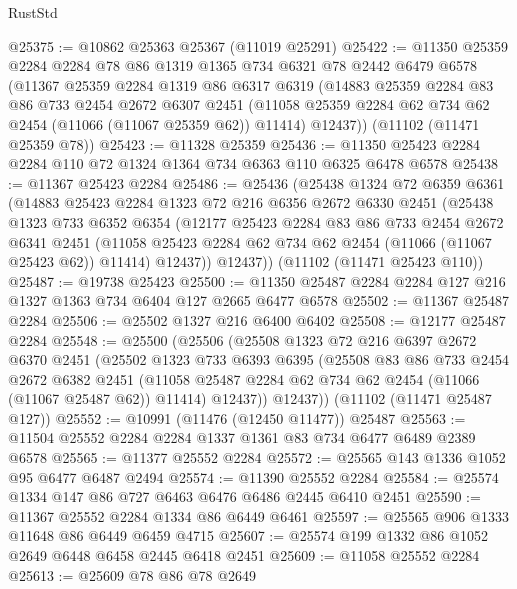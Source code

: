 \begin{lexlean}{RustStd}
\begin{coremodule}
@25375 := @10862 @25363 @25367 (@11019 @25291)
@25422 := @11350
    @25359
    @2284
    @2284
    @78
    @86
    @1319
    @1365
    @734
    @6321
    @78
    @2442
    @6479
    @6578
    (@11367
      @25359
      @2284
      @1319
      @86
      @6317
      @6319
      (@14883
        @25359
        @2284
        @83
        @86
        @733
        @2454
        @2672
        @6307
        @2451
        (@11058 @25359 @2284 @62 @734 @62 @2454 (@11066 (@11067 @25359 @62)) @11414)
        @12437))
    (@11102 (@11471 @25359 @78))
@25423 := @11328 @25359
@25436 := @11350 @25423 @2284 @2284 @110 @72 @1324 @1364 @734 @6363 @110 @6325 @6478 @6578
@25438 := @11367 @25423 @2284
@25486 := @25436
    (@25438
      @1324
      @72
      @6359
      @6361
      (@14883
        @25423
        @2284
        @1323
        @72
        @216
        @6356
        @2672
        @6330
        @2451
        (@25438
          @1323
          @733
          @6352
          @6354
          (@12177
            @25423
            @2284
            @83
            @86
            @733
            @2454
            @2672
            @6341
            @2451
            (@11058 @25423 @2284 @62 @734 @62 @2454 (@11066 (@11067 @25423 @62)) @11414)
            @12437))
        @12437))
    (@11102 (@11471 @25423 @110))
@25487 := @19738 @25423
@25500 := @11350 @25487 @2284 @2284 @127 @216 @1327 @1363 @734 @6404 @127 @2665 @6477 @6578
@25502 := @11367 @25487 @2284
@25506 := @25502 @1327 @216 @6400 @6402
@25508 := @12177 @25487 @2284
@25548 := @25500
    (@25506
      (@25508
        @1323
        @72
        @216
        @6397
        @2672
        @6370
        @2451
        (@25502
          @1323
          @733
          @6393
          @6395
          (@25508
            @83
            @86
            @733
            @2454
            @2672
            @6382
            @2451
            (@11058 @25487 @2284 @62 @734 @62 @2454 (@11066 (@11067 @25487 @62)) @11414)
            @12437))
        @12437))
    (@11102 (@11471 @25487 @127))
@25552 := @10991 (@11476 (@12450 @11477)) @25487
@25563 := @11504 @25552 @2284 @2284 @1337 @1361 @83 @734 @6477 @6489 @2389 @6578
@25565 := @11377 @25552 @2284
@25572 := @25565 @143 @1336 @1052 @95 @6477 @6487 @2494
@25574 := @11390 @25552 @2284
@25584 := @25574 @1334 @147 @86 @727 @6463 @6476 @6486 @2445 @6410 @2451
@25590 := @11367 @25552 @2284 @1334 @86 @6449 @6461
@25597 := @25565 @906 @1333 @11648 @86 @6449 @6459 @4715
@25607 := @25574 @199 @1332 @86 @1052 @2649 @6448 @6458 @2445 @6418 @2451
@25609 := @11058 @25552 @2284
@25613 := @25609 @78 @86 @78 @2649

\end{coremodule}
\end{lexlean}
